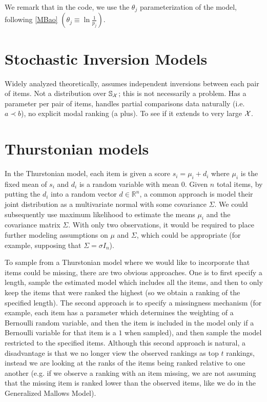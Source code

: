 \documentclass[10pt]{article}
\newcommand\bl{\left(}
\newcommand\br{\right)}
\begin{document}
We remark that in the code, we use the $\theta_j$ parameterization of the model, following \ref{MBao} $\bl \theta_j \equiv \ln{\frac{1}{p_j}} \br$.
\section{Stochastic Inversion Models}
\label{sec:stoch-i-m}
Widely analyzed theoretically, assumes independent inversions between each pair of items. Not a distribution over ${\mathbb S}_{{\mathcal X}}$; this is not necessarily a problem. Has a parameter per pair of items, handles partial comparisons data naturally (i.e. $a \prec b$), no explicit modal ranking (a plus). To see if it extends to very large ${\mathcal X}$. 




\section{Thurstonian models}
\label{sec:thurst}
In the Thurstonian model, each item is given a score $s_i = \mu_i + d_i$ where $\mu_i$ is the fixed mean of $s_i$ and $d_i$ is a random variable with mean $0$. Given $n$ total items, by putting the $d_i$ into a random vector $d \in \mathbb{R}^n$, a common approach is model their joint distribution as a multivariate normal with some covariance $\Sigma$. We could subsequently use maximum likelihood to estimate the means $\mu_i$ and the covariance matrix $\Sigma$. With only two observations, it would be required to place further modeling assumptions on $\mu$ and $\Sigma$, which could be appropriate (for example, supposing that $\Sigma = \sigma I_n$).

To sample from a Thurstonian model where we would like to incorporate that items could be missing, there are two obvious approaches. One is to first specify a length, sample the estimated model which includes all the items, and then to only keep the items that were ranked the highest (so we obtain a ranking of the specified length). The second approach is to specify a missingness mechanism (for example, each item has a parameter which determines the weighting of a Bernoulli random variable, and then the item is included in the model only if a Bernoulli variable for that item is a $1$ when sampled), and then sample the model restricted to the specified items. Although this second approach is natural, a disadvantage is that we no longer view the observed rankings as top $t$ rankings, instead we are looking at the ranks of the items being ranked relative to one another (e.g. if we observe a ranking with an item missing, we are not assuming that the missing item is ranked lower than the observed items, like we do in the Generalized Mallows Model).
\end{document}
